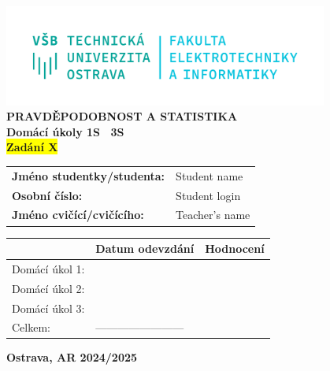 \documentclass[a4paper,12pt]{report}
\newcommand{\sourceId}   {X}
\newcommand{\studentName}{Student name}
\newcommand{\studentID}  {Student login}
\newcommand{\teacherName}{Teacher's name}
\begin{document}
\thispagestyle{empty}
\setcounter{page}{0}

\begin{center}
    \includegraphics[width=0.8\textwidth]{assets/logo.png} \\[4em]
    \vspace{4em}
    \textbf{PRAVDĚPODOBNOST A STATISTIKA} \\
    \vspace{1em}
    \textbf{Domácí úkoly 1S \textendash\ 3S} \\
    \textbf{\colorbox{yellow}{Zadání \sourceId}} \\
\end{center}

\vspace{2em}
\hspace{3em}
\begin{tabular}{ll}
    \textbf{Jméno studentky/studenta:}  & \hspace{6em} \studentName \\[0.5em]
    \textbf{Osobní číslo:}              & \hspace{6em} \studentID   \\[0.5em]
    \textbf{Jméno cvičící/cvičícího:}   & \hspace{6em} \teacherName \\
\end{tabular}

\vspace{10em}
\begin{center}
    \renewcommand{\arraystretch}{1.3}
    \begin{tabular}{|p{8em}|P{10em}|P{10em}|}
        \hline
                        & \textbf{Datum odevzdání}  & \textbf{Hodnocení}    \\ \hline
        Domácí úkol 1:  &                           &                       \\ \hline
        Domácí úkol 2:  &                           &                       \\ \hline
        Domácí úkol 3:  &                           &                       \\ \hline
        Celkem:         & ------------------------  &                       \\ \hline
    \end{tabular}
\end{center}

\vspace{5em}
\begin{center}
    \textbf{Ostrava, AR 2024/2025}
\end{center}

\newpage


\newpage


\newpage


\newpage


\newpage

\end{document}
